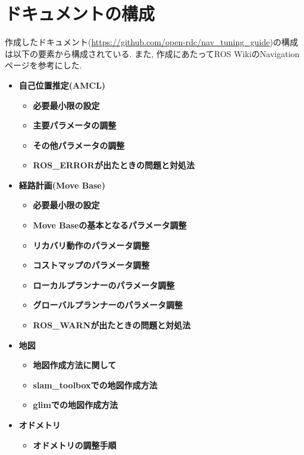 \section{ドキュメントの構成}
作成したドキュメント(\url{https://github.com/open-rdc/nav_tuning_guide})の構成は以下の要素から構成されている. 
また, 作成にあたってROS WikiのNavigationページを参考にした.
\cite{ros_wiki_navigation}
\begin{itemize}
     \item \textbf{自己位置推定(AMCL)}
     \begin{itemize}
        \item \textbf{必要最小限の設定}
        \item \textbf{主要パラメータの調整}
        \item \textbf{その他パラメータの調整}
        \item \textbf{ROS\_ERRORが出たときの問題と対処法}
    \end{itemize}
     \item \textbf{経路計画(Move Base)}
    \begin{itemize}
        \item \textbf{必要最小限の設定}
        \item \textbf{Move Baseの基本となるパラメータ調整}
        \item \textbf{リカバリ動作のパラメータ調整}
        \item \textbf{コストマップのパラメータ調整}
        \item \textbf{ローカルプランナーのパラメータ調整}
        \item \textbf{グローバルプランナーのパラメータ調整}
        \item \textbf{ROS\_WARNが出たときの問題と対処法}
    \end{itemize}
\newpage
     \item \textbf{地図}
    \begin{itemize}
        \item \textbf{地図作成方法に関して}
        \item \textbf{slam\_toolboxでの地図作成方法}
        \item \textbf{glimでの地図作成方法}
    \end{itemize}
    \item \textbf{オドメトリ}
    \begin{itemize}
        \item \textbf{オドメトリの調整手順}
    \end{itemize}     
\end{itemize}

